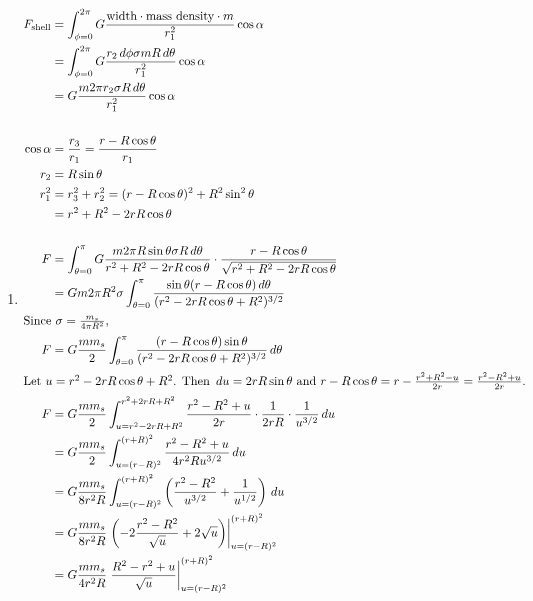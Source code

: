 \documentclass[solutions]{esg8012pset}
\renewcommand{\d}{\,d}
\begin{document}
  \begin{enumerate}[1)]
    \item \begin{align*}
     F_{\text{shell}} & = \int_{\phi=0}^{2\pi}G \frac{\text{width}\cdot \text{mass density}\cdot m}{r_1^2}\cos\alpha \\
      & = \int_{\phi=0}^{2\pi}G \frac{r_2\d{\phi}\sigma m R\d{\theta}}{r_1^2}\cos\alpha \\
      & = G \frac{m 2\pi r_2 \sigma  R\d{\theta}}{r_1^2}\cos\alpha \\
      \\
    \cos\alpha & = \frac{r_3}{r_1} = \frac{r - R\cos\theta}{r_1} \\
    r_2 & = R\sin\theta \\
    r_1^2 & = r_3^2 + r_2^2  = (r-R\cos\theta)^2+R^2\sin^2\theta \\
     & = r^2 + R^2 - 2rR\cos\theta \\
    \\
    F & = \int_{\theta = 0}^{\pi} G \frac{m 2\pi R\sin\theta \sigma  R\d{\theta}}{r^2 + R^2 - 2rR\cos\theta}\cdot \frac{r - R\cos\theta}{\sqrt{r^2 + R^2 - 2rR\cos\theta}} \\
     & = G m 2\pi R^2 \sigma \int_{\theta = 0}^{\pi} \frac{\sin\theta(r-R\cos\theta) \d{\theta}}{(r^2 - 2rR\cos\theta + R^2)^{3/2}} \\
    \intertext{Since $\sigma = \frac{m_s}{4\pi R^2}$,}
    F & = G \frac{m m_s}{2} \int_{\theta = 0}^{\pi} \frac{(r-R\cos\theta)\sin\theta}{(r^2 - 2rR\cos\theta + R^2)^{3/2}} \d{\theta} \\
    \intertext{Let $u=r^2-2rR\cos\theta + R^2$.  Then $\d u = 2rR\sin\theta$ and $r-R\cos\theta = r - \frac{r^2 + R^2 - u}{2r} = \frac{r^2 - R^2 + u}{2r}$.}
    F & = G \frac{m m_s}{2} \int_{u = r^2-2rR+R^2}^{r^2+2rR+R^2} \frac{r^2 - R^2 + u}{2r} \cdot \frac{1}{2rR} \cdot  \frac{1}{u^{3/2}} \d{u} \\
     & = G \frac{m m_s}{2} \int_{u = (r-R)^2}^{(r+R)^2} \frac{r^2 - R^2 + u}{4r^2Ru^{3/2}} \d{u} \\
     & = G \frac{m m_s}{8r^2R} \int_{u = (r-R)^2}^{(r+R)^2} \left(\frac{r^2 - R^2}{u^{3/2}} + \frac{1}{u^{1/2}}\right) \d{u} \\
     & = G \frac{m m_s}{8r^2R} \left.\left(-2\frac{r^2 - R^2}{\sqrt{u}} + 2\sqrt{u}\right)\right|_{u = (r-R)^2}^{(r+R)^2} \\
     & = G \frac{m m_s}{4r^2R} \left.\frac{R^2 - r^2 + u}{\sqrt{u}}\right|_{u = (r-R)^2}^{(r+R)^2} \\

\end{align*}
\end{enumerate}
\end{document}
